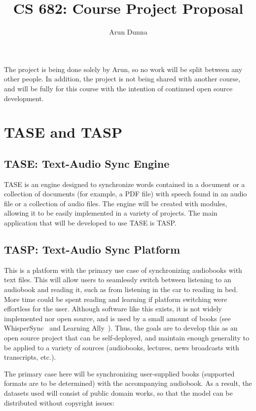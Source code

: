 \documentclass{article}
\title{CS 682: Course Project Proposal}
\author{Arun Dunna}
\date{}
\begin{document}
\maketitle

The project is being done solely by Arun, so no work will be split between any other people. In addition, the project is not being shared with another course, and will be fully for this course with the intention of continued open source development.

\section{TASE and TASP}
\subsection{TASE: Text-Audio Sync Engine}

TASE is an engine designed to synchronize words contained in a document or a collection of documents (for example, a PDF file) with speech found in an audio file or a collection of audio files. The engine will be created with modules, allowing it to be easily implemented in a variety of projects. The main application that will be developed to use TASE is TASP.

\subsection{TASP: Text-Audio Sync Platform}

This is a platform with the primary use case of synchronizing audiobooks with text files. This will allow users to seamlessly switch between listening to an audiobook and reading it, such as from listening in the car to reading in bed. More time could be spent reading and learning if platform switching were effortless for the user. Although software like this exists, it is not widely implemented nor open source, and is used by a small amount of books (see WhisperSync~\cite{WhispersyncforVoiceAudiblecom-2018-10-04} and Learning Ally~\cite{LearningAllyJoinLearningAllyAudiobookSubscriptionMembership-2018-10-04}). Thus, the goals are to develop this as an open source project that can be self-deployed, and maintain enough generality to be applied to a variety of sources (audiobooks, lectures, news broadcasts with transcripts, etc.).

The primary case here will be synchronizing user-supplied books (supported formats are to be determined) with the accompanying audiobook. As a result, the datasets used will consist of public domain works, so that the model can be distributed without copyright issues:
\end{document}
